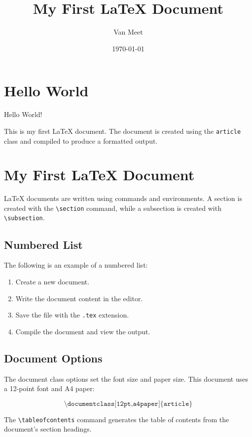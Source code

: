 \documentclass[12pt,a4paper]{article}
\title{My First LaTeX Document}
\author{Van Meet}
\date{\today}
\begin{document}
\maketitle

\tableofcontents

\section{Hello World}

Hello World!

This is my first LaTeX document. The document is created using the
\texttt{article} class and compiled to produce a formatted output.

\section{My First LaTeX Document}

LaTeX documents are written using commands and environments. A section
is created with the \texttt{\textbackslash section} command, while a
subsection is created with \texttt{\textbackslash subsection}.

\subsection{Numbered List}

The following is an example of a numbered list:

\begin{enumerate}
    \item Create a new document.
    \item Write the document content in the editor.
    \item Save the file with the \texttt{.tex} extension.
    \item Compile the document and view the output.
\end{enumerate}

\subsection{Document Options}

The document class options set the font size and paper size. This
document uses a 12-point font and A4 paper:

\[
\texttt{\textbackslash documentclass[12pt,a4paper]\{article\}}
\]

The \texttt{\textbackslash tableofcontents} command generates the
table of contents from the document's section headings.
\end{document}
